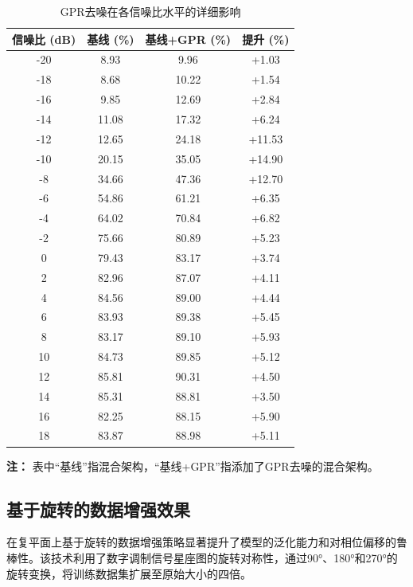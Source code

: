 \documentclass[conference]{IEEEtran}
\begin{document}
\begin{table}[!htbp]
\centering
\caption{GPR去噪在各信噪比水平的详细影响}
\label{tab:gpr_detailed_snr}
\begin{threeparttable}
\begin{tabular}{@{}cccc@{}}
\toprule
信噪比 (dB) & 基线 (\%) & 基线+GPR (\%) & 提升 (\%) \\
\midrule
-20 & 8.93 & 9.96 & +1.03 \\
-18 & 8.68 & 10.22 & +1.54 \\
-16 & 9.85 & 12.69 & +2.84 \\
-14 & 11.08 & 17.32 & +6.24 \\
-12 & 12.65 & 24.18 & +11.53 \\
-10 & 20.15 & 35.05 & +14.90 \\
-8 & 34.66 & 47.36 & +12.70 \\
-6 & 54.86 & 61.21 & +6.35 \\
-4 & 64.02 & 70.84 & +6.82 \\
-2 & 75.66 & 80.89 & +5.23 \\
0 & 79.43 & 83.17 & +3.74 \\
2 & 82.96 & 87.07 & +4.11 \\
4 & 84.56 & 89.00 & +4.44 \\
6 & 83.93 & 89.38 & +5.45 \\
8 & 83.17 & 89.10 & +5.93 \\
10 & 84.73 & 89.85 & +5.12 \\
12 & 85.81 & 90.31 & +4.50 \\
14 & 85.31 & 88.81 & +3.50 \\
16 & 82.25 & 88.15 & +5.90 \\
18 & 83.87 & 88.98 & +5.11 \\
\bottomrule
\end{tabular}
\begin{tablenotes}
\item[] \textbf{注：} 表中“基线”指混合架构，“基线+GPR”指添加了GPR去噪的混合架构。
\end{tablenotes}
\end{threeparttable}
\end{table}



\subsection{基于旋转的数据增强效果}

在复平面上基于旋转的数据增强策略显著提升了模型的泛化能力和对相位偏移的鲁棒性。该技术利用了数字调制信号星座图的旋转对称性，通过90°、180°和270°的旋转变换，将训练数据集扩展至原始大小的四倍。
\end{document}
